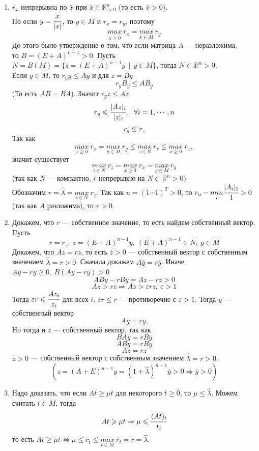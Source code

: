 \documentclass[12pt]{article}
\theoremstyle{definition}
\numberwithin{equation}{section}
\begin{document}
	\begin{enumerate}
		\item $r_x$ непрерывна по $\bar x$ при $\bar x \in \mathbb{R}^n_{>0}$ (то есть $\bar x >0$).\\
		Но если $y=\cfrac{x}{|x|}$, то $y \in M$ и $r_x=r_y$, поэтому $$\underset{x \geqslant \bar 0}{max}~r_x=\underset{\bar x \in M}{max}~r_y$$
		До этого было утверждение о том, что если матрица $A$ --- неразложима, \\то $B=(E+A)^{n-1}>0$. Пусть $N=B(M)= \{\bar z =(E+A)^{n-1} y~~|~~y \in M \}$, тогда $N \subset \mathbb{R}^n>0$.\\
		Если $y\in M$, то $r_y y \leqslant Ay$ и для $z=By$ $$r_yB_y \leqslant AB_y$$ (То есть $AB=BA$). Значит $r_y z \leqslant Az$ $$r_y \leqslant \cfrac{|Az|_i}{|z|_i},~~\forall i=1,\cdots, n$$ $$r_y \leqslant r_z$$
		Так как $$\underset{x \geqslant 0}{max}~r_x=\underset{y \in M}{max}~r_y \leqslant \underset{z\in B}{max}~r_z \leqslant \underset{x\geqslant 0}{max} ~r_x,$$ значит существует $$\underset{z\in N}{max}~r_z=\underset{x \geqslant 0}{max} ~r_x = \underset{y\in M}{max} ~r_y$$
		(так как $N$ --- компактно, $r$ непрерывно на $N \subset \mathbb{R}^n>0$)\\
		Обозначим $r=\hat \lambda =\underset{z\in N}{max}~r_z$. Так как $u=(1 \cdots 1)^T>0$, то $r_u-\underset{i}{min}\cfrac{|A_i|_1}{1}>0$ (так как $A$ разложима), то $r>0$.
		\item Докажем, что $r$ --- собственное значение, то есть найдем собственный вектор. Пусть $$r=r_z,~z=(E+A)^{n-1}y,~(E+A)^{n-1} \in N,~y\in M$$
		Докажем, что $Az=rz$, то есть $\bar z>0$ --- собственный вектор с собственным значением $\hat \lambda=r>0$. Сначала докажем $A\bar y=r \bar y$. Иначе $Ay-ry \geqslant 0,~B(Ay-ry)>0$ $$ABy-rBy=Az-rz>0$$ $$Az>rz \Rightarrow Az> \varepsilon rz, ~\varepsilon >1$$
		Тогда $\varepsilon r \leqslant \cfrac{Az_i}{z_i}$ для всех $i$. $\varepsilon r \leqslant r$ --- противоречие с $\varepsilon >1$. Тогда $y$ --- собственный вектор $$Ay=ry.$$ Но тогда и $z$ --- собственный вектор, так как $$BAy=rBy$$ $$ABy=rBy$$ $$Az=rz$$
		$z>0$ --- собственный вектор с собственным значением $\hat \lambda =r>0$.
		$$(z=(A+E)^{n-1}y=(1+\hat \lambda)^{n-1} \bar y>0 \Rightarrow \bar y>0)$$
		\item Надо доказать, что если $A\bar t \geqslant \mu \bar t$ для некоторого $\bar t \geqslant \bar 0$, то $\mu \leqslant \hat \lambda$. Можем считать $t \in M$, тогда $$At \geqslant \mu t \Rightarrow \mu \leqslant \cfrac{(At)_i}{t_i}$$ то есть $At \geqslant \mu t \Leftrightarrow \mu \leqslant r_t \leqslant \underset{t\in M}{max}~r_t=r=\hat \lambda$.

\end{enumerate}
\end{document}

